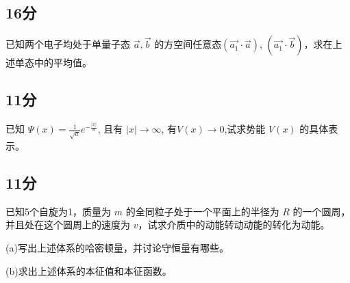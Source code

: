 \subsection{16分}
已知两个电子均处于单量子态 $\vec {a}, \vec{b}$ 的方空间任意态$(\vec{a_1} \cdot \vec{a})$, $(\vec{a_1} \cdot \vec{b})$，求在上述单态中的平均值。

\subsection{11分}
已知 $\Psi(x) = \frac{1}{\sqrt{a}} e^{-\frac{|x|}{a}}$, 且有 $|x| \rightarrow \infty$, 有$V(x)\to 0$,试求势能 $V(x)$ 的具体表示。

\subsection{11分}
已知5个自旋为1，质量为 $m$ 的全同粒子处于一个平面上的半径为 $R$ 的一个圆周，并且处在这个圆周上的速度为 $v$，试求介质中的动能转动动能的转化为动能。

(a)写出上述体系的哈密顿量，并讨论守恒量有哪些。

(b)求出上述体系的本征值和本征函数。